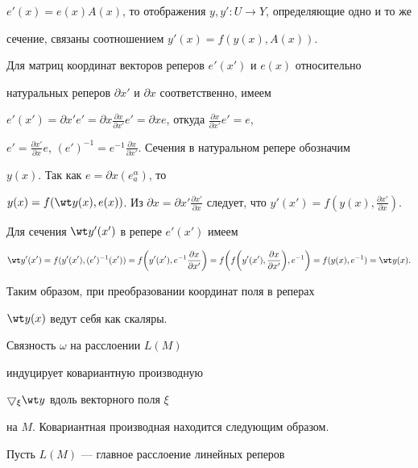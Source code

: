$e'(x)=e(x)A(x)$, то отображения $y,y': U\to Y$, определяющие одно и то же


сечение, связаны соотношением $y'(x)=f(y(x),A(x))$.





Для матриц координат векторов реперов $e'(x')$ и $e(x)$ относительно 


натуральных реперов $\partial x'$ и $\partial x$ соответственно, имеем


$e'(x')=\partial x' e'= \partial x \frac{ \partial x}{ \partial x'}e'=


\partial xe$, откуда $\frac{ \partial x}{ \partial x'}e'=e$,


$e'=\frac{ \partial x'}{ \partial x}e$, $(e')^{-1}=e^{-1}


\frac{ \partial x}{ \partial x'}$. Сечения в натуральном репере обозначим


$y(x)$. Так как $e=\partial x (e^\alpha_a)$, то


$y(x)=f(\wt y(x),e(x))$. Из $\partial x=\partial x'\frac{\partial x'}


{\partial x}$ следует, что $y'(x')=f(y(x),\frac{\partial x'}{\partial x})$.


Для сечения $\wt y'(x')$ в репере $e'(x')$ имеем


$$


\wt y'(x')=f(y'(x'),(e')^{-1}(x'))=f\bigg(y'(x'),e^{-1}


\frac{\partial x}{\partial x'}\bigg)=


f\bigg(f\bigg(y'(x'),\frac{\partial x}{\partial x'}\bigg),e^{-1}\bigg)=


f(y(x),e^{-1})=\wt y(x).


$$


Таким образом, при преобразовании координат поля в реперах


$\wt y(x)$ ведут себя как скаляры.





Связность $\omega$ на расслоении $L(M)$


индуцирует ковариантную производную


$\bigtriangledown_\xi\wt y$ вдоль векторного поля $\xi$


на $M$. Ковариантная производная находится следующим образом.





Пусть $L(M)$ --- главное расслоение линейных реперов



